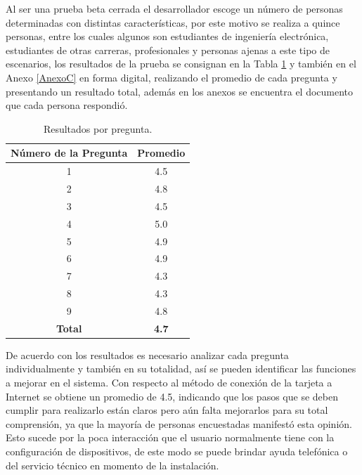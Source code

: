 Al ser una prueba beta cerrada el desarrollador escoge un número de personas determinadas con distintas características, por este motivo se realiza a quince personas, entre los cuales algunos son estudiantes de ingeniería electrónica, estudiantes de otras carreras, profesionales y personas ajenas a este tipo de escenarios, los resultados de la prueba se consignan en la Tabla \ref{table:enc} y también en el Anexo \ref{AnexoC} en forma digital, realizando el promedio de cada pregunta y presentando un resultado total, además en los anexos se encuentra el documento que cada persona respondió.\\

\begin{table}[H]
	\begin{center}
		\caption{Resultados por pregunta.}
		\label{table:enc}
		\begin{tabular}{|c|c|}
			\hline 
			\textbf{Número de la Pregunta} & \textbf{Promedio} \\ 
			\hline 
			1 & 4.5\\ 
			\hline 
			2 & 4.8\\ 
			\hline 
			3 & 4.5\\ 
			\hline 
			4 & 5.0\\ 
			\hline 
			5 & 4.9\\ 
			\hline 
			6 & 4.9\\ 
			\hline 
			7 & 4.3\\ 
			\hline 
			8 & 4.3\\ 
			\hline 
			9 & 4.8\\ 
			\hline 
			\textbf{Total} & \textbf{4.7}\\ 
			\hline 
		\end{tabular} 
	\end{center}
\end{table}

De acuerdo con los resultados es necesario analizar cada pregunta individualmente y también en su totalidad, así se pueden identificar las funciones a mejorar en el sistema. Con respecto al método de conexión de la tarjeta a Internet se obtiene un promedio de 4.5, indicando que los pasos que se deben cumplir para realizarlo están claros pero aún falta mejorarlos para su total comprensión, ya que la mayoría de personas encuestadas manifestó esta opinión. Esto sucede por la poca interacción que el usuario normalmente tiene con la configuración de dispositivos, de este modo se puede brindar ayuda telefónica o del servicio técnico en momento de la instalación.\\


